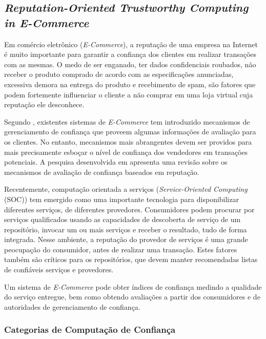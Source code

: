 \subsection{\textit{Reputation-Oriented Trustworthy Computing in E-Commerce} \cite{wang2008reputation}}

Em comércio eletrônico (\textit{E-Commerce}), a reputação de uma empresa na Internet é muito importante para garantir a confiança dos clientes
em realizar transações com as mesmas. O medo de ser enganado, ter dados confidenciais roubados, não receber o produto
comprado de acordo com as especificações anunciadas, excessiva demora na entrega
do produto e recebimento de spam, são fatores que podem fortemente influenciar o 
cliente a não comprar em uma loja virtual cuja reputação ele desconhece.

Segundo \cite{wang2008reputation}, existentes sistemas de \textit{E-Commerce} tem introduzido mecanismos de gerenciamento de confiança que proveem algumas informações de avaliação para os clientes. No entanto, mecanismos mais abrangentes devem ser providos para mais precisamente esboçar o nível de confiança dos vendedores em transações potenciais. A pesquisa desenvolvida em \cite{wang2008reputation} apresenta uma revisão sobre os mecanismos de avaliação de confiança baseados em reputação.

Recentemente, computação orientada a serviços (\textit{Service-Oriented Computing} (SOC)) tem emergido como uma importante tecnologia para disponibilizar diferentes serviços, de diferentes provedores. Consumidores podem procurar por serviços qualificados usando as capacidades de descoberta de serviço de um repositório, invocar um ou mais serviços e receber o resultado, tudo de forma integrada. Nesse ambiente, a reputação do provedor de serviços é uma grande peocupação do consumidor, antes de realizar uma transação. Estes fatores também são críticos para os repositórios, que devem manter recomendadas listas de confiáveis serviços e provedores.

Um sistema de \textit{E-Commerce} pode obter índices de confiança medindo a qualidade do serviço entregue, bem como obtendo avaliações a partir dos consumidores e de autoridades de gerenciamento de confiança.

\subsubsection{Categorias de Computação de Confiança}

